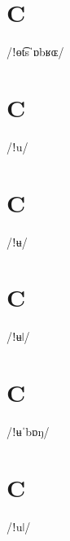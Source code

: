 \documentclass[10pt,a4paper,twoside]{book}
\begin{document}
\section*{C}

\begin{multicols}{3}
 {/ǃɵt͡sˈɒbʁɶ/} {}
\end{multicols}

\section*{C}

\begin{multicols}{3}
 {/ǃu/} {}
\end{multicols}

\section*{C}

\begin{multicols}{3}
 {/ǃʉ/} {}
\end{multicols}

\section*{C}

\begin{multicols}{3}
 {/ǃʉǀ/} {}
\end{multicols}

\section*{C}

\begin{multicols}{3}
 {/ǃʉˈbɒŋ/} {}
\end{multicols}

\section*{C}

\begin{multicols}{3}
 {/ǃuǀ/} {}
\end{multicols}
\end{document}
